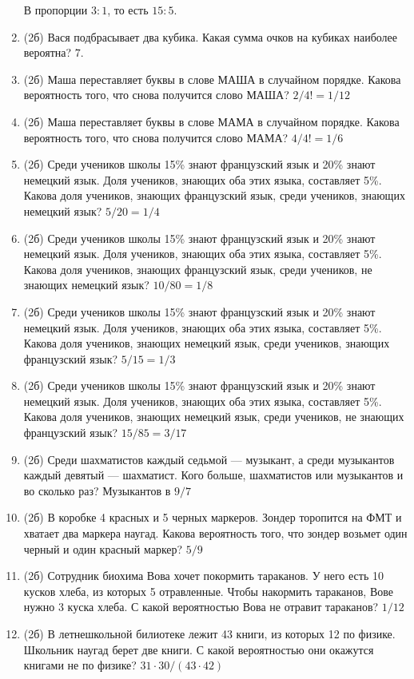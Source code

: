\documentclass[a4paper, 12pt]{article}
\begin{document}
\begin{enumerate}
  В пропорции $3:1$, то есть $15:5$.
  \item (2б) Вася подбрасывает два кубика. Какая сумма очков на кубиках наиболее вероятна? $7$.
  \item (2б) Маша переставляет буквы в слове МАША в случайном порядке. Какова вероятность того, что снова получится слово МАША? $2/4!=1/12$
  \item (2б) Маша переставляет буквы в слове МАМА в случайном порядке. Какова вероятность того, что снова получится слово МАМА? $4/4!=1/6$
  \item (2б) Среди учеников школы 15\% знают французский язык и 20\% знают немецкий язык. Доля учеников, знающих оба этих языка, составляет 5\%. Какова доля учеников, знающих французский язык, среди учеников, знающих немецкий язык? $5/20=1/4$
  \item (2б) Среди учеников школы 15\% знают французский язык и 20\% знают немецкий язык. Доля учеников, знающих оба этих языка, составляет 5\%. Какова доля учеников, знающих французский язык, среди учеников, не знающих немецкий язык? $10/80=1/8$
  \item (2б) Среди учеников школы 15\% знают французский язык и 20\% знают немецкий язык. Доля учеников, знающих оба этих языка, составляет 5\%. Какова доля учеников, знающих немецкий язык, среди учеников, знающих французский язык? $5/15=1/3$
  \item (2б) Среди учеников школы 15\% знают французский язык и 20\% знают немецкий язык. Доля учеников, знающих оба этих языка, составляет 5\%. Какова доля учеников, знающих немецкий язык, среди учеников, не знающих французский язык? $15/85=3/17$
  \item (2б) Среди шахматистов каждый седьмой — музыкант, а среди музыкантов каждый девятый — шахматист. Кого больше, шахматистов или музыкантов и во сколько раз? Музыкантов в $9/7$
  \item (2б) В коробке 4 красных и 5 черных маркеров.
  Зондер торопится на ФМТ и хватает два маркера наугад.
  Какова вероятность того, что зондер возьмет один черный и один красный маркер? $5/9$
  \item (2б) Сотрудник биохима Вова хочет покормить тараканов.
  У него есть 10 кусков хлеба, из которых 5 отравленные. Чтобы накормить тараканов,
  Вове нужно 3 куска хлеба. С какой вероятностью Вова не отравит тараканов?  $1/12$
  \item (2б) В летнешкольной билиотеке лежит 43 книги, из которых 12 по физике.
  Школьник наугад берет две книги. С какой вероятностью они окажутся книгами не по физике? $31 \cdot 30 / (43 \cdot 42)$
\end{enumerate}
\end{document}
